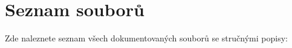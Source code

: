 \section{Seznam souborů}
Zde naleznete seznam všech dokumentovaných souborů se stručnými popisy\+:\begin{DoxyCompactList}
\item{}
\end{DoxyCompactList}
